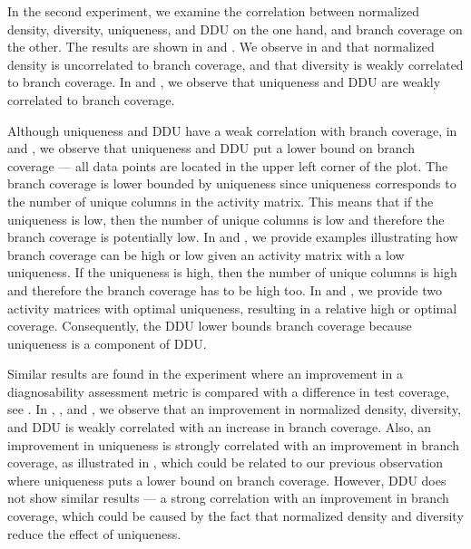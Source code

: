 \documentclass[twoside,a4paper,11pt]{memoir}
\begin{document}
In the second experiment, we examine the correlation between normalized density, diversity, uniqueness, and DDU on the one hand, and branch coverage on the other.
The results are shown in  and .
We observe in  and  that normalized density is uncorrelated to branch coverage, and that diversity is weakly correlated to branch coverage.
In  and , we observe that uniqueness and DDU are weakly correlated to branch coverage.

Although uniqueness and DDU have a weak correlation with branch coverage, in  and , we observe that uniqueness and DDU put a lower bound on branch coverage --- all data points are located in the upper left corner of the plot.
The branch coverage is lower bounded by uniqueness since uniqueness corresponds to the number of unique columns in the activity matrix.
This means that if the uniqueness is low, then the number of unique columns is low and therefore the branch coverage is potentially low.
In  and , we provide examples illustrating how branch coverage can be high or low given an activity matrix with a low uniqueness.
If the uniqueness is high, then the number of unique columns is high and therefore the branch coverage has to be high too.
In  and , we provide two activity matrices with optimal uniqueness, resulting in a relative high or optimal coverage.
Consequently, the DDU lower bounds branch coverage because uniqueness is a component of DDU\@.

Similar results are found in the experiment where an improvement in a diagnosability assessment metric is compared with a difference in test coverage, see .
In , , and , we observe that an improvement in normalized density, diversity, and DDU is weakly correlated with an increase in branch coverage.
Also, an improvement in uniqueness is strongly correlated with an improvement in branch coverage, as illustrated in , which could be related to our previous observation where uniqueness puts a lower bound on branch coverage.
However, DDU does not show similar results --- a strong correlation with an improvement in branch coverage, which could be caused by the fact that normalized density and diversity reduce the effect of uniqueness.
\end{document}
